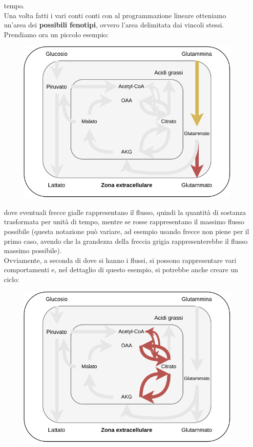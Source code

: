 \documentclass[a4paper,12pt, oneside]{book}
\begin{document}
tempo. \\
Una volta fatti i vari conti conti con al programmazione lineare otteniamo
un'area dei \textbf{possibili fenotipi}, ovvero l'area delimitata dai vincoli
stessi.\\
Prendiamo ora un piccolo esempio:
\begin{figure}[H]
  \centering
  \includegraphics[scale = 0.8]{img/toy.pdf}
\end{figure}
dove eventuali frecce gialle rappresentano il flusso, quindi la
quantità di sostanza trasformata per unità di tempo, mentre se rosse
rappresentano il massimo flusso possibile (questa notazione può variare, ad
esempio usando frecce non piene per il primo caso, avendo che la grandezza della
freccia grigia rappresenterebbe il flusso massimo possibile).\\
Ovviamente, a seconda di dove si hanno i flussi, si possono rappresentare vari
comportamenti e, nel dettaglio di questo esempio, si potrebbe anche creare un
ciclo:
\begin{figure}[H]
  \centering
  \includegraphics[scale = 0.8]{img/toy2.pdf}
\end{figure}
\end{document}
